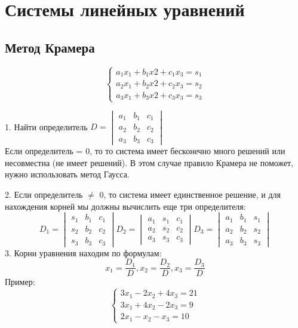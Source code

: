 \documentclass[12pt,a4paper]{article}
\begin{document}
\section{Системы линейных уравнений}
\subsection{Метод Крамера}
\begin{equation*}
 \begin{cases}
   a_{1}x_{1}+b_{1}x{2}+c_{1}x_{3}=s_{1}
   \\
   a_{2}x_{1}+b_{2}x{2}+c_{2}x_{3}=s_{2}
   \\
   a_{3}x_{1}+b_{3}x{2}+c_{3}x_{3}=s_{3}
 \end{cases}
\end{equation*}

1. Найти определитель $D = \begin{vmatrix}
a_{1}& b_{1}& c_{1} \\
a_{2}& b_{2}& c_{2} \\
a_{3}& b_{3}& c_{3}
\end{vmatrix}$ \\
Если определитель = 0, то то система имеет бесконечно много решений или несовместна (не имеет решений). В этом случае правило Крамера не поможет, нужно использовать метод Гаусса. 

2. Если определитель $\neq$ 0, то система имеет единственное решение, и для нахождения корней мы должны вычислить еще три определителя:
$$D_{1} =
\begin{vmatrix}
s_{1}& b_{1}& c_{1} \\
s_{2}& b_{2}& c_{2} \\
s_{3}& b_{3}& c_{3}
\end{vmatrix} 
D_{2} =
\begin{vmatrix}
a_{1}& s_{1}& c_{1} \\
a_{2}& s_{2}& c_{2} \\
a_{3}& s_{3}& c_{3}
\end{vmatrix}
D_{3} =
\begin{vmatrix}
a_{1}& b_{1}& s_{1} \\
a_{2}& b_{2}& s_{2} \\
a_{3}& b_{3}& s_{3}
\end{vmatrix}$$
3. Корни уравнения находим по формулам:
$$x_{1} = \frac{D_{1}}{D}, x_{2} = \frac{D_{2}}{D}, x_{3} = \frac{D_{3}}{D}$$
Пример: \begin{equation*}
 \begin{cases}
   3x_{1}-2x_{2}+4x_{3}=21
   \\
   3x_{1}+4x_{2}-2x_{3}=9
   \\
   2x_{1}-x_{2}-x_{3}=10
 \end{cases}
\end{equation*}
\end{document}
